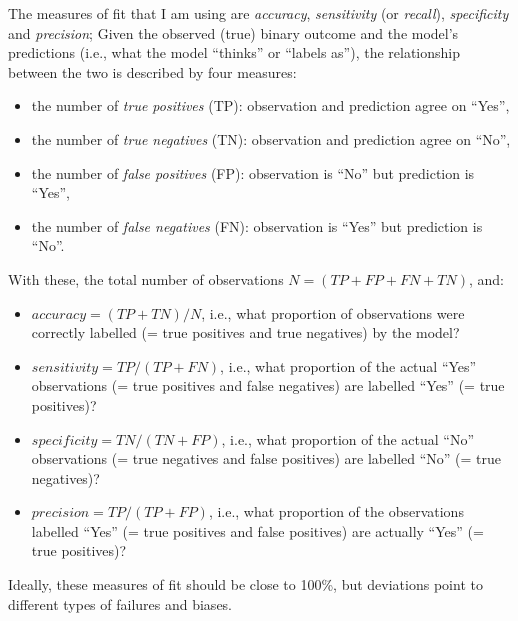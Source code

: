 \documentclass[twoside,onecolumn]{article}
\begin{document}
The measures of fit that I am using are \emph{accuracy}, \emph{sensitivity} (or \emph{recall}), \emph{specificity} and \emph{precision}; Given the observed (true) binary outcome and the model's predictions (i.e., what the model ``thinks'' or ``labels as''), the relationship between the two is described by four measures:

\begin{itemize}
  \item the number of \emph{true positives} (TP): observation and prediction agree on ``Yes'',
  \item the number of \emph{true negatives} (TN): observation and prediction agree on ``No'',
  \item the number of \emph{false positives} (FP): observation is ``No'' but prediction is ``Yes'',
  \item the number of \emph{false negatives} (FN): observation is ``Yes'' but prediction is ``No''.
\end{itemize}

With these, the total number of observations $N = (TP+FP+FN+TN)$, and:

\begin{itemize}
  \item $accuracy = (TP+TN)/N$, i.e., what proportion of observations were correctly labelled (= true positives and true negatives) by the model?
  \item $sensitivity = TP/(TP+FN)$, i.e., what proportion of the actual ``Yes'' observations (= true positives and false negatives) are labelled ``Yes'' (= true positives)?
  \item $specificity = TN/(TN+FP)$, i.e., what proportion of the actual ``No'' observations (= true negatives and false positives) are labelled ``No'' (= true negatives)?
  \item $precision = TP/(TP+FP)$, i.e., what proportion of the observations labelled ``Yes'' (= true positives and false positives) are actually ``Yes'' (= true positives)?
\end{itemize}

Ideally, these measures of fit should be close to 100\%, but deviations point to different types of failures and biases.
\end{document}
